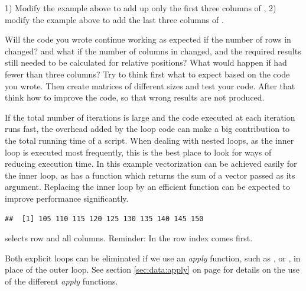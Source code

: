 \documentclass[krantz2]{krantz}\usepackage{knitr}%
\begin{document}
\begin{advplayground}
1) Modify the example above to add up only the first three columns of , 2) modify the example above to add the last three columns of .

Will the code you wrote continue working as expected if the number of rows in  changed? and what if the number of columns in  changed, and the required results still needed to be calculated for relative positions? What would happen if  had fewer than three columns? Try to think first what to expect based on the code you wrote. Then create matrices of different sizes and test your code. After that think how to improve the code, so that wrong results are not produced.
\end{advplayground}

\begin{explainbox}
If the total number of iterations is large and the code executed at each iteration runs fast, the overhead added by the loop code can make a big contribution to the total running time of a script.
When dealing with nested loops, as the inner loop is executed most frequently, this is the best place to look for ways of reducing execution time. In this example vectorization can be achieved easily for the inner loop, as \Rlang has a function  which returns the sum of a vector passed as its argument. Replacing the inner loop by an efficient function can be expected to improve performance significantly.

\begin{knitrout}\footnotesize
{}\color{fgcolor}\begin{kframe}
\begin{alltt}
 \hlkwb{<-} \hlstd{(} 
   \hlopt{:}
   \hlkwb{<-} 
\hlstd{\}}
\end{alltt}
\begin{verbatim}
##  [1] 105 110 115 120 125 130 135 140 145 150
\end{verbatim}
\end{kframe}
\end{knitrout}

 selects row  and all columns. Reminder: In \Rlang the row index comes first.

Both explicit loops can be eliminated if we use an \emph{apply} function, such as ,  or , in place of the outer  loop. See section \ref{sec:data:apply} on page \pageref{sec:data:apply} for details on the use of the different \emph{apply} functions.


\end{explainbox}
\end{document}
